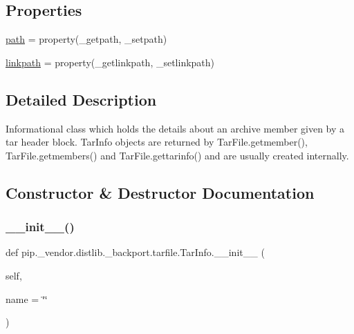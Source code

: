 \subsection*{Properties}
\begin{DoxyCompactItemize}
\item 
\hyperlink{classpip_1_1__vendor_1_1distlib_1_1__backport_1_1tarfile_1_1TarInfo_a888fee3df3510ea358aa9a47bb907ae1}{path} = property(\+\_\+getpath, \+\_\+setpath)
\item 
\hyperlink{classpip_1_1__vendor_1_1distlib_1_1__backport_1_1tarfile_1_1TarInfo_a288c6e5b054b6f6d7d4699d2c474a293}{linkpath} = property(\+\_\+getlinkpath, \+\_\+setlinkpath)
\end{DoxyCompactItemize}


\subsection{Detailed Description}
\begin{DoxyVerb}Informational class which holds the details about an
   archive member given by a tar header block.
   TarInfo objects are returned by TarFile.getmember(),
   TarFile.getmembers() and TarFile.gettarinfo() and are
   usually created internally.
\end{DoxyVerb}
 

\subsection{Constructor \& Destructor Documentation}
\mbox{\label{classpip_1_1__vendor_1_1distlib_1_1__backport_1_1tarfile_1_1TarInfo_a98917e3c6098b5d46516276870f62711}} 
\subsubsection{\texorpdfstring{\+\_\+\+\_\+init\+\_\+\+\_\+()}{\_\_init\_\_()}}
{\footnotesize\ttfamily def pip.\+\_\+vendor.\+distlib.\+\_\+backport.\+tarfile.\+Tar\+Info.\+\_\+\+\_\+init\+\_\+\+\_\+ (\begin{DoxyParamCaption}\item[{}]{self,  }\item[{}]{name = {\ttfamily \char`\"{}\char`\"{}} }\end{DoxyParamCaption})}

